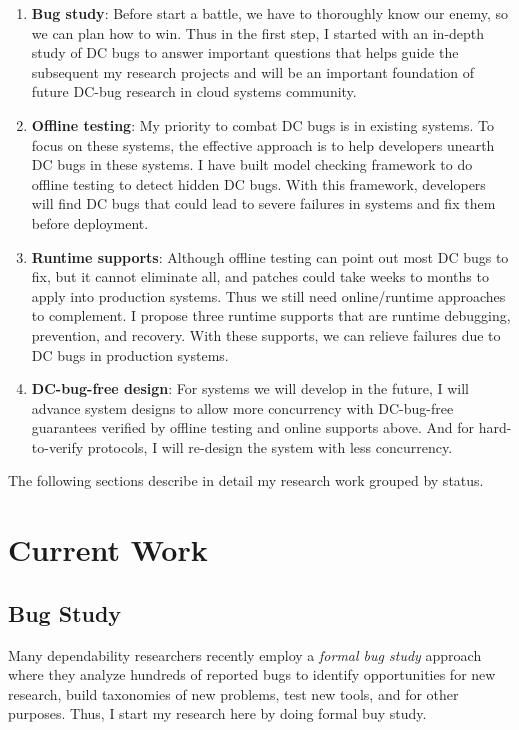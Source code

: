 \documentclass[11pt]{article}
\begin{document}
\begin{enumerate}

\item \textbf{Bug study}: Before start a battle, we have to thoroughly know our
enemy, so we can plan how to win. Thus in the first step, I started with an
in-depth study of DC bugs to answer important questions that helps guide the
subsequent my research projects and will be an important foundation of future
DC-bug research in cloud systems community.

\item \textbf{Offline testing}: My priority to combat DC bugs is in existing
systems. To focus on these systems, the effective approach is to help
developers unearth DC bugs in these systems. I have built model checking
framework to do offline testing to detect hidden DC bugs. With this framework,
developers will find DC bugs that could lead to severe failures in systems and
fix them before deployment.

\item \textbf{Runtime supports}: Although offline testing can point out most DC
bugs to fix, but it cannot eliminate all, and patches could take weeks to months
to apply into production systems. Thus we still need online/runtime approaches
to complement. I propose three runtime supports that are runtime debugging,
prevention, and recovery. With these supports, we can relieve failures due to DC
bugs in production systems.

\item \textbf{DC-bug-free design}: For systems we will develop in the future, I
will advance system designs to allow more concurrency with DC-bug-free
guarantees verified by offline testing and online supports above. And for
hard-to-verify protocols, I will re-design the system with less concurrency.
\fi

\end{enumerate}

The following sections describe in detail my research work grouped by status.

\section*{Current Work}

\subsection{Bug Study}

Many dependability researchers recently employ a \textit{formal bug study}
approach where they analyze hundreds of reported bugs to identify opportunities
for new research, build taxonomies of new problems, test new tools, and for
other purposes. Thus, I start my research here by doing formal buy study.
\end{document}
